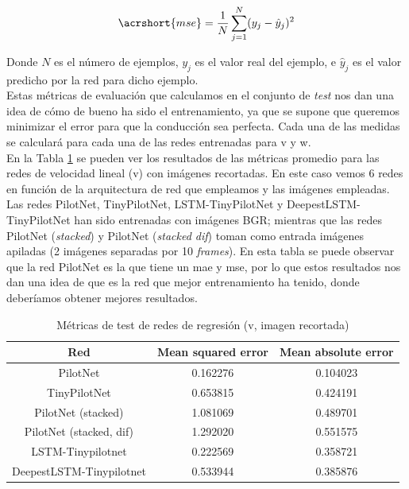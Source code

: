 \begin{equation}\label{eq:mse_reg}
    \acrshort{mse} = \frac{1}{N}\sum_{j=1}^{N}(y_j - \hat{y}_j)^2
\end{equation}
\vspace{10pt}

Donde \(N\) es el número de ejemplos, \(y_j\) es el valor real del ejemplo, e \(\hat{y}_j\) es el valor predicho por la red para dicho ejemplo.\\

Estas métricas de evaluación que calculamos en el conjunto de \textit{test} nos dan una idea de cómo de bueno ha sido el entrenamiento, ya que se supone que queremos minimizar el error para que la conducción sea perfecta. Cada una de las medidas se calculará para cada una de las redes entrenadas para v y w.\\

En la Tabla \ref{metricas_regresion_recortada_v} se pueden ver los resultados de las métricas promedio para las redes de velocidad lineal (v) con imágenes recortadas. En este caso vemos 6 redes en función de la arquitectura de red que empleamos y las imágenes empleadas. Las redes PilotNet, TinyPilotNet, LSTM-TinyPilotNet y DeepestLSTM-TinyPilotNet han sido entrenadas con imágenes BGR; mientras que las redes PilotNet (\textit{stacked}) y PilotNet (\textit{stacked dif}) toman como entrada imágenes apiladas (2 imágenes separadas por 10 \textit{frames}). En esta tabla se puede observar que la red PilotNet es la que tiene un \acrshort{mae} y \acrshort{mse}, por lo que estos resultados nos dan una idea de que es la red que mejor entrenamiento ha tenido, donde deberíamos obtener mejores resultados.\\

\begin{table}[H]
\centering
\caption{Métricas de test de redes de regresión (v, imagen recortada)}
\label{metricas_regresion_recortada_v}
\begin{tabular}{c|c|c|}
\cline{1-3}
                        \multicolumn{1}{|c|}{Red}    & Mean squared error       & Mean absolute error             \\ \hline
\multicolumn{1}{|c|}{PilotNet}    & 0.162276   & 0.104023   \\ \hline
\multicolumn{1}{|c|}{TinyPilotNet}     & 0.653815      & 0.424191   \\ \hline
\multicolumn{1}{|c|}{PilotNet (stacked)}   & 1.081069    & 0.489701   \\ \hline
\multicolumn{1}{|c|}{PilotNet (stacked, dif)}     & 1.292020    & 0.551575        \\ \hline
\multicolumn{1}{|c|}{LSTM-Tinypilotnet}     & 0.222569   & 0.358721        \\ \hline
\multicolumn{1}{|c|}{DeepestLSTM-Tinypilotnet}     & 0.533944   & 0.385876        \\ \hline
\end{tabular}
\end{table}


